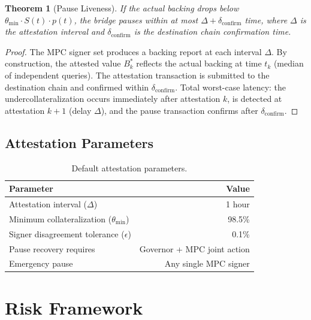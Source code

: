 \documentclass[11pt,twocolumn]{article}
\newtheorem{theorem}{Theorem}[section]
\begin{document}
\begin{theorem}[Pause Liveness]\label{thm:pause}
If the actual backing drops below $\theta_{\min} \cdot S(t) \cdot p(t)$, the bridge pauses within at most $\Delta + \delta_{\text{confirm}}$ time, where $\Delta$ is the attestation interval and $\delta_{\text{confirm}}$ is the destination chain confirmation time.
\end{theorem}

\begin{proof}
The MPC signer set produces a backing report at each interval $\Delta$. By construction, the attested value $B^*_k$ reflects the actual backing at time $t_k$ (median of independent queries). The attestation transaction is submitted to the destination chain and confirmed within $\delta_{\text{confirm}}$. Total worst-case latency: the undercollateralization occurs immediately after attestation $k$, is detected at attestation $k+1$ (delay $\Delta$), and the pause transaction confirms after $\delta_{\text{confirm}}$.
\end{proof}

\subsection{Attestation Parameters}

\begin{table}[h]
\centering
\small
\caption{Default attestation parameters.}
\label{tab:attestation_params}
\begin{tabular}{@{}lr@{}}
\toprule
\textbf{Parameter} & \textbf{Value} \\
\midrule
Attestation interval ($\Delta$) & 1 hour \\
Minimum collateralization ($\theta_{\min}$) & 98.5\% \\
Signer disagreement tolerance ($\epsilon$) & 0.1\% \\
Pause recovery requires & Governor + MPC joint action \\
Emergency pause & Any single MPC signer \\
\bottomrule
\end{tabular}
\end{table}

\section{Risk Framework}\label{sec:risk}
\end{document}
